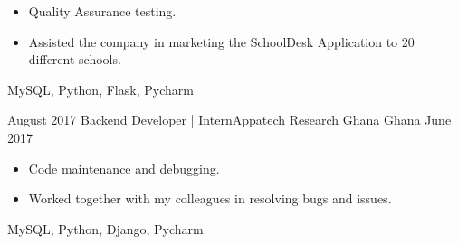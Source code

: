 \begin{experiences}
{\begin{itemize}
                        \item Quality Assurance testing.
                        
                        \item Assisted the company in marketing the SchoolDesk Application to 20 different schools.
                      \end{itemize}
                    }
                    {MySQL, Python, Flask, Pycharm}
  \emptySeparator
  
    \experience
    {August 2017}     {Backend Developer | Intern}{Appatech Research Ghana }{Ghana}
    {June 2017}    {
                      \begin{itemize}
                        \item Code maintenance and debugging.
                        
                        \item Worked together with my colleagues in resolving bugs and issues.
                      \end{itemize}
                    }
                    { MySQL, Python, Django, Pycharm}
  \emptySeparator
\end{experiences}

